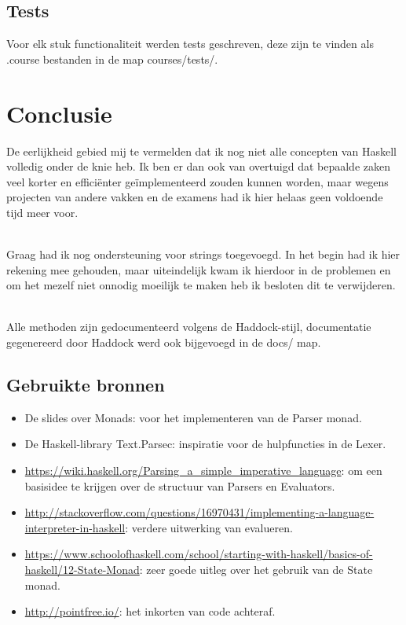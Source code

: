 \documentclass[12pt,a4paper]{report}
\begin{document}
\section{Tests}
Voor elk stuk functionaliteit werden tests geschreven, deze zijn te vinden als .course bestanden in de map courses/tests/.
\chapter{Conclusie}
De eerlijkheid gebied mij te vermelden dat ik nog niet alle concepten van Haskell volledig onder de knie heb. Ik ben er dan ook van overtuigd dat bepaalde zaken veel korter en efficiënter geïmplementeerd zouden kunnen worden, maar wegens projecten van andere vakken en de examens had ik hier helaas geen voldoende tijd meer voor.\par\mbox{}\\
Graag had ik nog ondersteuning voor strings toegevoegd. In het begin had ik hier rekening mee gehouden, maar uiteindelijk kwam ik hierdoor in de problemen en om het mezelf niet onnodig moeilijk te maken heb ik besloten dit te verwijderen.\par\mbox{}\\
Alle methoden zijn gedocumenteerd volgens de Haddock-stijl, documentatie gegenereerd door Haddock werd ook bijgevoegd in de docs/ map.
\section{Gebruikte bronnen}
\begin{itemize}
  \item De slides over Monads: voor het implementeren van de Parser monad.
  \item De Haskell-library Text.Parsec: inspiratie voor de hulpfuncties in de Lexer.
  \item \url{https://wiki.haskell.org/Parsing_a_simple_imperative_language}: om een basisidee te krijgen over de structuur van Parsers en Evaluators.
  \item   \sloppy\url{http://stackoverflow.com/questions/16970431/implementing-a-language-interpreter-in-haskell}: verdere uitwerking van evalueren.
  \item \sloppy\url{https://www.schoolofhaskell.com/school/starting-with-haskell/basics-of-haskell/12-State-Monad}: zeer goede uitleg over het gebruik van de State monad.
  \item \url{http://pointfree.io/}: het inkorten van code achteraf.
\end{itemize}
\newpage
\end{document}

